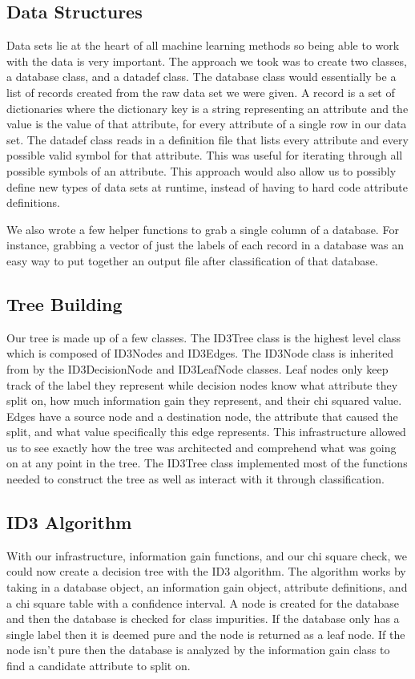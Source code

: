\documentclass{IEEEtran}
\begin{document}
\subsection{Data Structures}
Data sets lie at the heart of all machine learning methods so being
able to work with the data is very important. The approach we took was
to create two classes, a database class, and a datadef class. The
database class would essentially be a list of records created from the
raw data set we were given. A record is a set of dictionaries where
the dictionary key is a string representing an attribute and the value
is the value of that attribute, for every attribute of a single row in
our data set. The datadef class reads in a definition file that lists
every attribute and every possible valid symbol for that
attribute. This was useful for iterating through all possible symbols
of an attribute. This approach would also allow us to possibly define
new types of data sets at runtime, instead of having to hard code
attribute definitions. 

We also wrote a few helper functions to grab a single column of a
database. For instance, grabbing a vector of just the labels of each
record in a database was an easy way to put together an output file
after classification of that database.

\subsection{Tree Building}
Our tree is made up of a few classes. The ID3Tree class is the highest
level class which is composed of ID3Nodes and ID3Edges. The ID3Node
class is inherited from by the ID3DecisionNode and ID3LeafNode
classes. Leaf nodes only keep track of the label they represent while
decision nodes know what attribute they split on, how much information
gain they represent, and their chi squared value. Edges have a source
node and a destination node, the attribute that caused the split, and
what value specifically this edge represents. This infrastructure
allowed us to see exactly how the tree was architected and comprehend
what was going on at any point in the tree. The ID3Tree class
implemented most of the functions needed to construct the tree as well
as interact with it through classification.

\subsection{ID3 Algorithm}
With our infrastructure, information gain functions, and our chi
square check, we could now create a decision tree with the ID3
algorithm. The algorithm works by taking in a database object, an
information gain object, attribute definitions, and a chi square table
with a confidence interval. A node is created for the database and
then the database is checked for class impurities. If the database
only has a single label then it is deemed pure and the node is
returned as a leaf node. If the node isn't pure then the database
is analyzed by the information gain class to find a candidate
attribute to split on.
\end{document}

